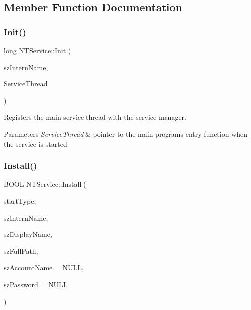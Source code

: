 \subsection{Member Function Documentation}
\mbox{\label{classNTService_a7d64ca859f231aa1aacc56832cc0d641}} 
\subsubsection{\texorpdfstring{Init()}{Init()}}
{\footnotesize\ttfamily long N\+T\+Service\+::\+Init (\begin{DoxyParamCaption}\item[{L\+P\+C\+S\+TR}]{sz\+Intern\+Name,  }\item[{void $\ast$}]{Service\+Thread }\end{DoxyParamCaption})}

Registers the main service thread with the service manager.


\begin{DoxyParams}{Parameters}
{\em Service\+Thread} & pointer to the main programs entry function when the service is started \\
\hline
\end{DoxyParams}
\mbox{\label{classNTService_aab2e98bbe52de94d66b64f7a27e68c5b}} 
\subsubsection{\texorpdfstring{Install()}{Install()}}
{\footnotesize\ttfamily B\+O\+OL N\+T\+Service\+::\+Install (\begin{DoxyParamCaption}\item[{int}]{start\+Type,  }\item[{L\+P\+C\+S\+TR}]{sz\+Intern\+Name,  }\item[{L\+P\+C\+S\+TR}]{sz\+Display\+Name,  }\item[{L\+P\+C\+S\+TR}]{sz\+Full\+Path,  }\item[{L\+P\+C\+S\+TR}]{sz\+Account\+Name = {\ttfamily NULL},  }\item[{L\+P\+C\+S\+TR}]{sz\+Password = {\ttfamily NULL} }\end{DoxyParamCaption})}

